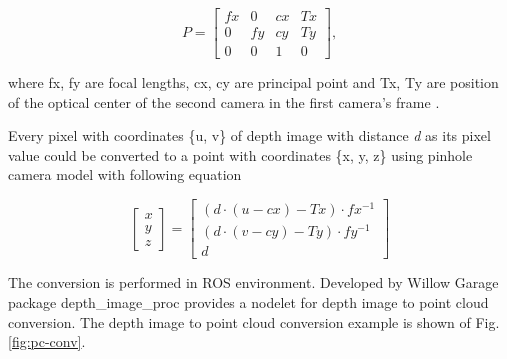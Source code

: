 \documentclass{ctuthesis}
\begin{document}
\[P = \begin{bmatrix}
fx & 0 & cx & Tx\\
0 & fy & cy & Ty\\
0 & 0 & 1 & 0
\end{bmatrix}, \]

where fx, fy are focal lengths, cx, cy are principal point and Tx, Ty are position of the optical center of the second camera in the first camera's frame \cite{ros}.

Every pixel with coordinates \{u, v\} of depth image with distance \emph{d} as its pixel value could be converted to a point with coordinates \{x, y, z\} using pinhole camera model with following equation

\[\begin{bmatrix}
x\\
y\\
z
\end{bmatrix} = \begin{bmatrix}
(d \cdot (u - cx) - Tx) \cdot fx^{-1}\\
(d \cdot (v - cy) - Ty) \cdot fy^{-1}\\
d
\end{bmatrix} \]

The conversion is performed in ROS environment. Developed by Willow Garage package depth\_image\_proc provides a nodelet for depth image to point cloud conversion. The depth image to point cloud conversion example is shown of Fig.\ref{fig:pc-conv}.
\end{document}
